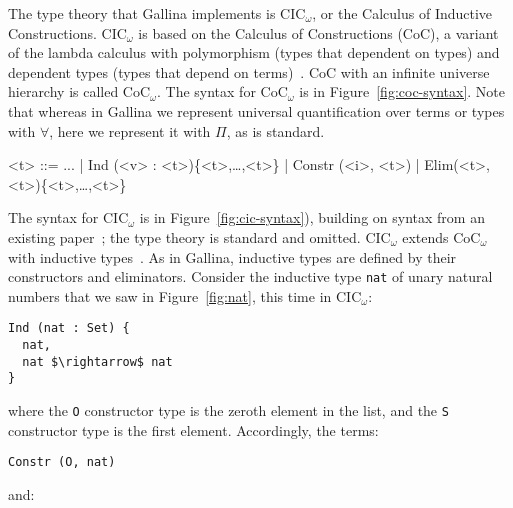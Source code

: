 The type theory that Gallina implements is CIC$_{\omega}$, or the Calculus of Inductive Constructions.
CIC$_{\omega}$ is based on the Calculus of Constructions (CoC), a variant of the lambda calculus with polymorphism (types that dependent on types) and dependent types (types that depend on terms)~\cite{coquand:inria-00076024}.
CoC with an infinite universe hierarchy is called CoC$_{\omega}$. %
The syntax for CoC$_{\omega}$ is in Figure~\ref{fig:coc-syntax}.
Note that whereas in Gallina we represent universal quantification over terms or types with $\forall$, here we represent it with $\Pi$, as is standard.

\begin{figure*}
\small
\begin{grammar}
<t> ::= ... | \hspace{0.06cm} Ind (<v> : <t>)\{<t>,\ldots,<t>\} \hspace{0.06cm} | \hspace{0.06cm} Constr (<i>, <t>) \hspace{0.06cm} | \hspace{0.06cm} Elim(<t>, <t>)\{<t>,\ldots,<t>\}
\end{grammar}
\vspace{-0.3cm}
\caption{CIC$_\omega$ is CoC$_\omega$ with inductive types, inductive constructors, and .}
\label{fig:cic-syntax}
\end{figure*}

The syntax for CIC$_{\omega}$ is in Figure~\ref{fig:cic-syntax}), building on syntax from an existing paper~\cite{Timany2015FirstST};
the type theory is standard and omitted. %
CIC$_{\omega}$ extends CoC$_{\omega}$ with inductive types~\cite{inductive}.
As in Gallina, inductive types are defined by their constructors and eliminators.
Consider the inductive type \lstinline{nat} of unary natural numbers that we saw in Figure~\ref{fig:nat},
this time in CIC$_{\omega}$: %

\begin{lstlisting}
Ind (nat : Set) {
  nat,
  nat $\rightarrow$ nat
}
\end{lstlisting}
where the \lstinline{O} constructor type is the zeroth element in the list, and the \lstinline{S} constructor type is the first element.
Accordingly, the terms:

\begin{lstlisting}
Constr (O, nat)
\end{lstlisting}
and:

